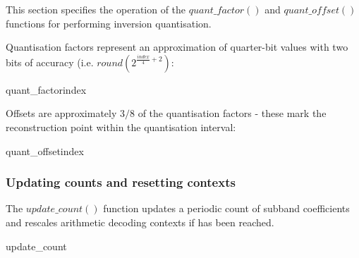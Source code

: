 This section specifies the operation of the $quant\_factor()$ and 
$quant\_offset()$ functions for performing inversion quantisation.

Quantisation factors represent an approximation of quarter-bit values 
with two bits of accuracy (i.e. $round(2^{\frac{index}{4}+2})$:

\begin{pseudo}{quant\_factor}{index}
\bsEND
\end{pseudo}

Offsets are approximately $3/8$ of the quantisation factors - these
mark the reconstruction point within the quantisation interval:

\begin{pseudo}{quant\_offset}{index}
\end{pseudo}

\subsubsection{Updating counts and resetting contexts}
\label{updatecounts}

The $update\_count()$ function updates a periodic count of subband 
coefficients and rescales arithmetic decoding contexts if \CoefficientReset has been reached.

\begin{pseudo}{update\_count}{}
\bsIF{\CoefficientCount == \CoefficientReset}
  \bsEND
\bsEND
\end{pseudo}
